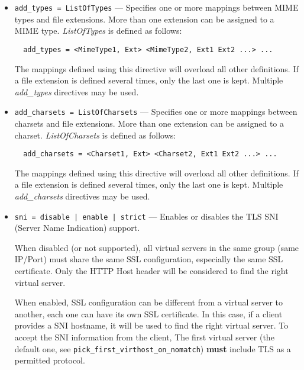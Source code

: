 \documentclass[11pt,oneside,english]{book}
\begin{document}
\begin{itemize}
\item        \verb+add_types = ListOfTypes+ ---
              Specifies one or more mappings between MIME types and file
              extensions. More than one extension can be assigned to a MIME
              type. \textit{ListOfTypes} is defined as follows:
\begin{verbatim}
  add_types = <MimeType1, Ext> <MimeType2, Ext1 Ext2 ...> ...
\end{verbatim}
              The mappings defined using this directive will overload all other
              definitions. If a file extension is defined several times, only
              the last one is kept. Multiple \textit{add\_types} directives may
              be used.

\item        \verb+add_charsets = ListOfCharsets+ ---
              Specifies one or more mappings between charsets and file
              extensions. More than one extension can be assigned to a
              charset. \textit{ListOfCharsets} is defined as follows:
\begin{verbatim}
  add_charsets = <Charset1, Ext> <Charset2, Ext1 Ext2 ...> ...
\end{verbatim}
              The mappings defined using this directive will overload all other
              definitions. If a file extension is defined several times, only
              the last one is kept. Multiple \textit{add\_charsets} directives
              may be used.

\item        \verb+sni = disable | enable | strict+ ---
              Enables or disables the TLS SNI (Server Name Indication) support.

              When disabled (or not supported), all virtual servers in the same
              group (same IP/Port) must share the same SSL configuration,
              especially the same SSL certificate. Only the HTTP Host header
              will be considered to find the right virtual server.

              When enabled, SSL configuration can be different from a virtual
              server to another, each one can have its own SSL certificate. In
              this case, if a client provides a SNI hostname, it will be used to
              find the right virtual server. To accept the SNI information from
              the client, The first virtual server (the default one, see
              \verb+pick_first_virthost_on_nomatch+) \textbf{must} include TLS
              as a permitted protocol.


\end{itemize}
\end{document}
